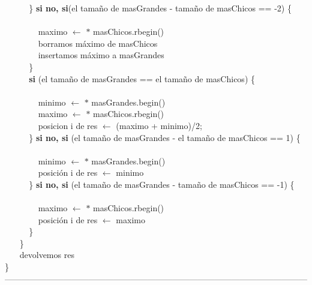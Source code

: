 $~~~~~~~~~~~~~$\} \textbf{si no, si}(el tamaño de masGrandes - tamaño de masChicos == -2) \{ \\ \\
$~~~~~~~~~~~~~~~~~~$maximo $\leftarrow$ $\ast$ masChicos.rbegin() \\
$~~~~~~~~~~~~~~~~~~$borramos máximo de masChicos  \\
$~~~~~~~~~~~~~~~~~~$insertamos máximo a masGrandes  \\
$~~~~~~~~~~~~~$\} \\
$~~~~~~~~~~~~~$\textbf{si} (el tamaño de masGrandes == el tamaño de masChicos) \{ \\ \\
$~~~~~~~~~~~~~~~~~~$minimo $\leftarrow$ $\ast$ masGrandes.begin() \\
$~~~~~~~~~~~~~~~~~~$maximo $\leftarrow$ $\ast$ masChicos.rbegin() \\
$~~~~~~~~~~~~~~~~~~$posicion i de res $\leftarrow$ (maximo + minimo)/2; \\
$~~~~~~~~~~~~~$\} \textbf{si no, si} (el tamaño de masGrandes - el tamaño de masChicos == 1) \{ \\ \\
$~~~~~~~~~~~~~~~~~~$minimo $\leftarrow$ $\ast$ masGrandes.begin()  \\
$~~~~~~~~~~~~~~~~~~$posición i de res $\leftarrow$  minimo  \\
$~~~~~~~~~~~~~$\} \textbf{si no, si} (el tamaño de masGrandes - tamaño de masChicos == -1) \{ \\ \\
$~~~~~~~~~~~~~~~~~~$maximo $\leftarrow$ $\ast$ masChicos.rbegin() \\
$~~~~~~~~~~~~~~~~~~$posición i de res $\leftarrow$ maximo \\
$~~~~~~~~~~~~~$\} \\
$~~~~~~~~$\} \\
$~~~~~~~~$devolvemos res \\
\} \\
------------------------------------------------------------------------------------------------------------\\

